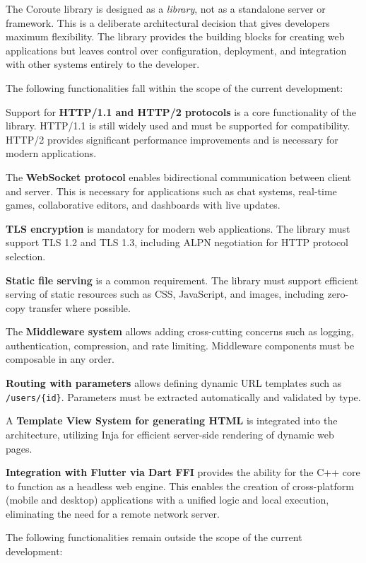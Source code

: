 The Coroute library is designed as a \textit{library}, not as a standalone server or framework. This is a deliberate architectural decision that gives developers maximum flexibility. The library provides the building blocks for creating web applications but leaves control over configuration, deployment, and integration with other systems entirely to the developer.

The following functionalities fall within the scope of the current development:

Support for \textbf{HTTP/1.1 and HTTP/2 protocols} is a core functionality of the library. HTTP/1.1 is still widely used and must be supported for compatibility. HTTP/2 provides significant performance improvements and is necessary for modern applications.

The \textbf{WebSocket protocol} enables bidirectional communication between client and server. This is necessary for applications such as chat systems, real-time games, collaborative editors, and dashboards with live updates.

\textbf{TLS encryption} is mandatory for modern web applications. The library must support TLS 1.2 and TLS 1.3, including ALPN negotiation for HTTP protocol selection.

\textbf{Static file serving} is a common requirement. The library must support efficient serving of static resources such as CSS, JavaScript, and images, including zero-copy transfer where possible.

The \textbf{Middleware system} allows adding cross-cutting concerns such as logging, authentication, compression, and rate limiting. Middleware components must be composable in any order.

\textbf{Routing with parameters} allows defining dynamic URL templates such as \texttt{/users/\{id\}}. Parameters must be extracted automatically and validated by type.

A \textbf{Template View System for generating HTML} is integrated into the architecture, utilizing Inja for efficient server-side rendering of dynamic web pages.

\textbf{Integration with Flutter via Dart FFI} provides the ability for the C++ core to function as a headless web engine. This enables the creation of cross-platform (mobile and desktop) applications with a unified logic and local execution, eliminating the need for a remote network server.

The following functionalities remain outside the scope of the current development:

